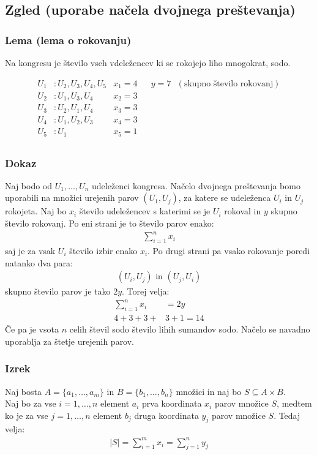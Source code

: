\subsection{Zgled (uporabe načela dvojnega preštevanja)}

\subsubsection{Lema (lema o rokovanju)}
Na kongresu je število vseh vdeležencev ki se rokojejo liho mnogokrat, sodo.


\begin{align*}
    U_1&: U_2, U_3, U_4, U_5 & x_1 = 4 && y = 7 \text{ }(\text{skupno število rokovanj})\\ 
    U_2&: U_1, U_3, U_4      & x_2 = 3 \\
    U_3&: U_2, U_1, U_4      & x_3 = 3 \\
    U_4&: U_1, U_2, U_3      & x_4 = 3 \\
    U_5&: U_1                & x_5 = 1 \\
\end{align*}


\subsubsection{Dokaz}
Naj bodo od $U_1, \dots, U_n$ udeleženci kongresa. Načelo dvojnega preštevanja bomo uporabili na množici urejenih parov $(U_1, U_j)$, za katere se udeleženca $U_i$ in $U_j$ rokojeta. Naj bo $x_i$ število udeležencev s katerimi se je $U_i$ rokoval in $y$ skupno število rokovanj.
Po eni strani je to število parov enako:
\begin{align*}
    \sum_{i = 1}^{n} x_i
\end{align*}
saj je za vsak $U_i$ število izbir enako $x_i$. Po drugi strani pa vsako rokovanje poredi natanko dva para:
\begin{align*}
    (U_i, U_j) \text{ in } (U_j, U_i)
\end{align*}
skupno število parov je tako $2y$.
Torej velja:
\begin{align*}
    \sum_{i = 1}^{n} x_i & = 2y \\
    4 + 3 + 3 + & 3 + 1 = 14 
\end{align*}
Če pa je vsota $n$ celih števil sodo število lihih sumandov sodo.
Načelo se navadno uporablja za štetje urejenih parov.


\subsubsection{Izrek}
Naj bosta $A = \{ a_1, \dots, a_m \}$ in $B = \{ b_1, \dots, b_n \}$ množici in naj bo $S \subseteq A \times B$. \\
Naj bo za vse $i = 1, \dots, n$ element $a_i$ prva koordinata $x_i$ parov množice $S$, medtem ko je za vse $j = 1, \dots, n$ element $b_j$ druga koordinata $y_j$ parov množice $S$. Tedaj velja:
\begin{align*}
    |S| = \sum_{i = 1}^{m} x_i = \sum_{j = 1}^{n} y_j    
\end{align*}


